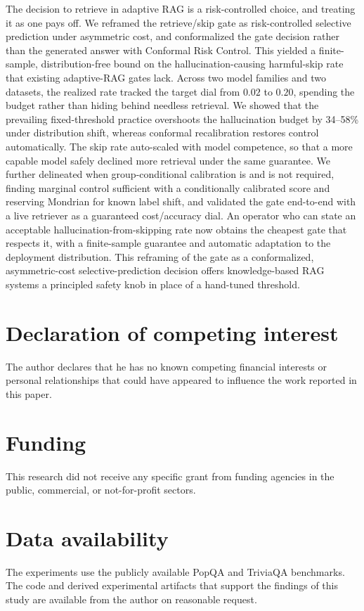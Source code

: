 \documentclass[a4paper,fleqn]{cas-dc}
\begin{document}
The decision to retrieve in adaptive RAG is a risk-controlled choice, and
treating it as one pays off. We reframed the retrieve/skip gate as risk-controlled
selective prediction under asymmetric cost, and conformalized the gate decision
rather than the generated answer with Conformal Risk Control. This yielded a
finite-sample, distribution-free bound on the hallucination-causing harmful-skip
rate that existing adaptive-RAG gates lack. Across two model families and two
datasets, the realized rate tracked the target dial from $0.02$ to $0.20$,
spending the budget rather than hiding behind needless retrieval. We showed that
the prevailing fixed-threshold practice overshoots the hallucination budget by
34--58\% under distribution shift, whereas conformal recalibration restores
control automatically. The skip rate auto-scaled with model competence, so that a
more capable model safely declined more retrieval under the same guarantee. We
further delineated when group-conditional calibration is and is not required,
finding marginal control sufficient with a conditionally calibrated score and
reserving Mondrian for known label shift, and validated the gate end-to-end with
a live retriever as a guaranteed cost/accuracy dial. An operator who can state an
acceptable hallucination-from-skipping rate now obtains the cheapest gate that
respects it, with a finite-sample guarantee and automatic adaptation to the
deployment distribution. This reframing of the gate as a conformalized,
asymmetric-cost selective-prediction decision offers knowledge-based RAG systems
a principled safety knob in place of a hand-tuned threshold.

\section*{Declaration of competing interest}
The author declares that he has no known competing financial interests or
personal relationships that could have appeared to influence the work reported in
this paper.

\section*{Funding}
This research did not receive any specific grant from funding agencies in the
public, commercial, or not-for-profit sectors.

\section*{Data availability}
The experiments use the publicly available PopQA \citep{mallen2023popqa} and
TriviaQA \citep{joshi2017triviaqa} benchmarks. The code and derived experimental
artifacts that support the findings of this study are available from the author on
reasonable request.
\end{document}
